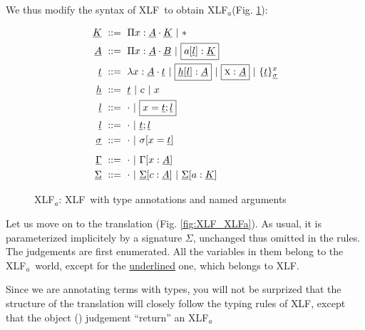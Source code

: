 \documentclass[preprint]{sigplanconf}
\newcommand\memph[1]{\boxed{#1}}
\newcommand\gor{\ |\ }
\newcommand\gequal{\ ::=\ }
\newcommand\meta[1]{\textsc{#1}}
\newcommand\typ[2]{{#1}:{#2}}
\newcommand\mv{x}
\newcommand\mmeta{\meta x}
\newcommand\mco{c}
\newcommand\mcf{a}
\newcommand\postbinder{\cdot}
\newcommand\prd[2]{\Pi{#1}:{#2}\postbinder}
\newcommand\tlam[2]{\lambda{#1}:{#2}\postbinder}
\newcommand\lam{\tlam}
\newcommand\obox[3]{\{{#1}\}^{#2}_{#3}}
\newcommand\srt[1]{\mathsf{#1}}
\newcommand\type{\srt *}
\newcommand\laapp[3]{{#1}[{#2}]:{#3}}
\newcommand\lnil{\cdot}
\newcommand\lcons[2]{{#1};{#2}}
\newcommand\lncons[3]{{#1}={#2};{#3}}
\newcommand\enil\cdot
\newcommand\eent[1]{[{#1}]}
\newcommand\econs[2]{{#1}\eent{#2}}
\newcommand\ebinddecl[3]{\econs{#1}{{#2}:{#3}}}
\newcommand\snil\enil
\newcommand\sent[2]{[{#1}={#2}]}
\newcommand\scons[3]{{#1}\sent{#2}{#3}}
\newcommand\lang[1]{\textsf{#1}}
\newcommand\XLF{\lang{XLF}}
\newcommand\XLFa{\lang{XLF$_a$}}
\newcommand\XLFamod[1]{\underline{#1}}
\def\inXLFa{\def\thelangmod{\XLFamod}}
\newcommand\mk{\thelangmod{K}}
\newcommand\mf{\thelangmod{A}}
\newcommand\mmf{\thelangmod{B}}
\newcommand\mo{\thelangmod{t}}
\newcommand\mh{\thelangmod{h}}
\newcommand\ma{\thelangmod{l}}
\newcommand\ms{\thelangmod{\sigma}}
\newcommand\me{\thelangmod{\Gamma}}
\newcommand\msi{\thelangmod{\Sigma}}
\begin{document}
We thus modify the syntax of \XLF\ to obtain \XLFa (Fig. \ref{fig:XLFa}):

\begin{figure}
  \inXLFa
  \begin{align*}
    \mk &\gequal { \prd\mv\mf\mk
      \gor \type } \\
    \mf &\gequal { \prd\mv\mf\mmf
      \gor \memph{\laapp\mcf\ma\mk} } \\
    \mo &\gequal { \lam\mv\mf\mo
      \gor \memph{\laapp\mh\ma\mf}
      \gor \memph{\typ\mmeta\mf}
      \gor \obox\mo\mv\ms } \\
    \mh &\gequal { \mo
      \gor \mco
      \gor \mv } \\
    \ma &\gequal {\lnil
      \gor \memph{\lncons \mv\mo\ma}} \\
    \ma &\gequal { \lnil
      \gor \lcons\mo\ma } \\
    \ms &\gequal { \snil
      \gor \scons \sigma\mv\mo } \\[0.5em]
    \me &\gequal { \enil
      \gor \ebinddecl \Gamma\mv\mf } \\
    \msi &\gequal { \enil
      \gor \ebinddecl\msi\mco\mf
      \gor \ebinddecl\msi\mcf\mk }
  \end{align*}
  \caption{\XLFa: \XLF\ with type annotations and named arguments}
\label{fig:XLFa}
\end{figure}
Let us move on to the translation (Fig. \ref{fig:XLF_XLFa}). As usual,
it is parameterized implicitely by a signature $\Sigma$, unchanged
thus omitted in the rules. The judgements are first enumerated. All
the variables in them belong to the \XLFa\ world, except for the
\underline{underlined} one, which belongs to \XLF.

Since we are annotating terms with types, you will not be surprized
that the structure of the translation will closely follow the typing
rules of \XLF, except that the object () judgement ``return'' an \XLFa %
\end{document}
